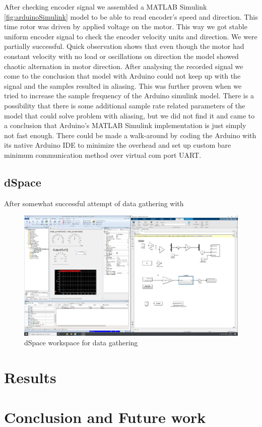\documentclass[]{final_report}
\begin{document}
After checking encoder signal we assembled a MATLAB Simulink \ref{fig:arduinoSimulink} model to be able to read encoder's speed and direction. This time rotor was driven by applied voltage on the motor. This way we got stable uniform encoder signal to check the encoder velocity units and direction. We were partially successful. Quick observation shows that even though the motor had constant velocity with no load or oscillations on direction the model showed chaotic alternation in motor direction. After analysing the recorded signal we come to the conclusion that model with Arduino could not keep up with the signal and the samples resulted in aliasing. This was further proven when we tried to increase the sample frequency of the Arduino simulink model. There is a possibility that there is some additional sample rate related parameters of the model that could solve problem with aliasing, but we did not find it and came to a conclusion that Arduino's MATLAB Simulink implementation is just simply not fast enough. There could be made a walk-around by coding the Arduino with its native Arduino IDE to minimize the overhead and set up custom bare minimum communication method over virtual com port UART.

\section{dSpace}

After somewhat successful attempt of data gathering with 
\begin{figure} [h!]
\centerline{\includegraphics[width=.75\textwidth]{Screenshots for paper/dSpace/photo_2021-03-09 11.37.29.jpeg}}
\caption{dSpace workspace for data gathering}
\label{fig:dSpaceEx1}
\end{figure}



\chapter{Results}

\chapter{Conclusion and Future work}




\newpage

 

\label{endpage}
\end{document}
